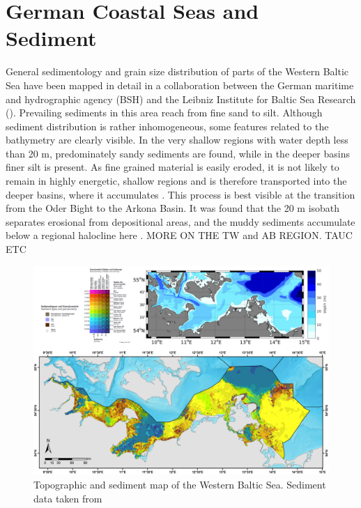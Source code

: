 \section{German Coastal Seas and Sediment}

General sedimentology and grain size distribution of parts of the Western 
Baltic Sea have 
been mapped in detail in a collaboration between the German maritime and 
hydrographic agency (BSH) and the Leibniz Institute for Baltic Sea Research 
(). Prevailing sediments in this area reach from 
fine sand to silt. Although sediment distribution is rather inhomogeneous, some 
features related to the bathymetry are clearly visible. In the very shallow 
regions with water depth less than 20 m, predominately sandy sediments are 
found, while in the deeper basins finer silt is present.
As fine grained material is easily eroded, it is not likely to remain in highly 
energetic, shallow regions and is therefore transported into the deeper basins, 
where 
it accumulates \citep[][]{basys1}. This process is best visible at the 
transition from the Oder Bight to the Arkona Basin. It was found that the 20 m 
isobath separates erosional from depositional areas, and the muddy sediments 
accumulate below a regional halocline here \citep[][]{basys2}. MORE ON THE 
TW and AB REGION. TAUC ETC

\begin{figure}[ht]
 \flushleft
 \includegraphics[width=15cm]{bilder/sediment.pdf}
 \caption{Topographic and sediment map of the Western Baltic 
Sea. Sediment data taken from \citep[][]{tauber2012}}\label{westernbaltic}
\end{figure}